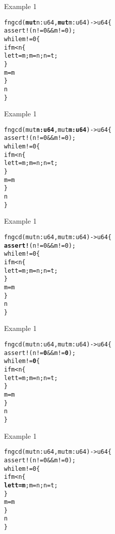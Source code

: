 \documentclass[aspectratio=1610,t]{beamer}
\newcommand\hi[1]{{\color{mainorange} \textbf{#1}}}
\begin{document}

\begin{frame}[fragile]{Example 1}
\begin{alltt}
fn gcd(\hi{mut} n: u64, \hi{mut} m: u64) -> u64 \{
    assert!(n != 0 && m != 0);
    while m != 0 \{
        if m < n \{
            let t = m; m = n; n = t;
        \}
        m = m % n;
    \}
    n
\}
\end{alltt}
\end{frame}


\begin{frame}[fragile]{Example 1}
\begin{alltt}
fn gcd(mut \hi{n: u64}, mut \hi{m: u64}) -> u64 \{
    assert!(n != 0 && m != 0);
    while m != 0 \{
        if m < n \{
            let t = m; m = n; n = t;
        \}
        m = m % n;
    \}
    n
\}
\end{alltt}
\end{frame}


\begin{frame}[fragile]{Example 1}
\begin{alltt}
fn gcd(mut n: u64, mut m: u64) -> u64 \{
    \hi{assert!}(n != 0 && m != 0);
    while m != 0 \{
        if m < n \{
            let t = m; m = n; n = t;
        \}
        m = m % n;
    \}
    n
\}
\end{alltt}
\end{frame}


\begin{frame}[fragile]{Example 1}
\begin{alltt}
fn gcd(mut n: u64, mut m: u64) -> u64 \{
    assert!(n != \hi{0} && m != \hi{0});
    while m != \hi{0} \{
        if m < n \{
            let t = m; m = n; n = t;
        \}
        m = m % n;
    \}
    n
\}
\end{alltt}
\end{frame}


\begin{frame}[fragile]{Example 1}
\begin{alltt}
fn gcd(mut n: u64, mut m: u64) -> u64 \{
    assert!(n != 0 && m != 0);
    while m != 0 \{
        if m < n \{
            \hi{let t = m}; m = n; n = t;
        \}
        m = m % n;
    \}
    n
\}
\end{alltt}
\end{frame}
\end{document}
